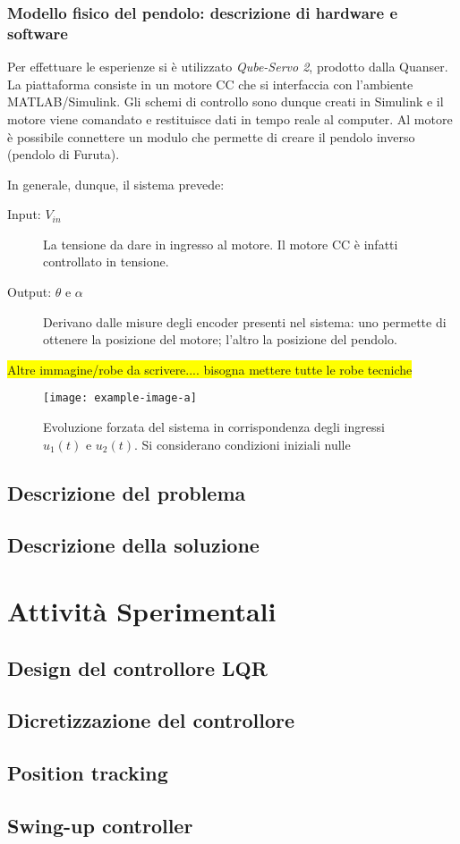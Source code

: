 \documentclass[11pt]{article}
\begin{document}
\subsubsection*{Modello fisico del pendolo: descrizione di hardware e software}
Per effettuare le esperienze si è utilizzato \textit{Qube-Servo 2}, prodotto dalla Quanser. La piattaforma consiste in un motore CC che si interfaccia con l'ambiente MATLAB/Simulink. Gli schemi di controllo sono dunque creati in Simulink e il motore viene comandato e restituisce dati in tempo reale al computer.
Al motore è possibile connettere un modulo che permette di creare il pendolo inverso (pendolo di Furuta).

In generale, dunque, il sistema prevede:
\begin{description}
    \item [Input: $V_{in}$] La tensione da dare in ingresso al motore. Il motore CC è infatti controllato in tensione.
    \item [Output: $\theta$ e $\alpha$] Derivano dalle misure degli encoder presenti nel sistema: uno permette di ottenere la posizione del motore; l'altro la posizione del pendolo.
\end{description}

\colorbox{yellow}{Altre immagine/robe da scrivere.... bisogna mettere tutte le robe tecniche} 


\begin{figure}[H]
	\centering
	\texttt{[image: example-image-a]}
	\caption{Evoluzione forzata del sistema in corrispondenza degli ingressi $u_1(t)$ e $u_2(t)$. Si considerano condizioni iniziali nulle}
	\label{fig:1}
\end{figure}









\subsection{Descrizione del problema}




\subsection{Descrizione della soluzione}




\section{Attività Sperimentali}

\subsection{Design del controllore LQR}
\subsection{Dicretizzazione del controllore}
\subsection{Position tracking}
\subsection{Swing-up controller}
\end{document}
